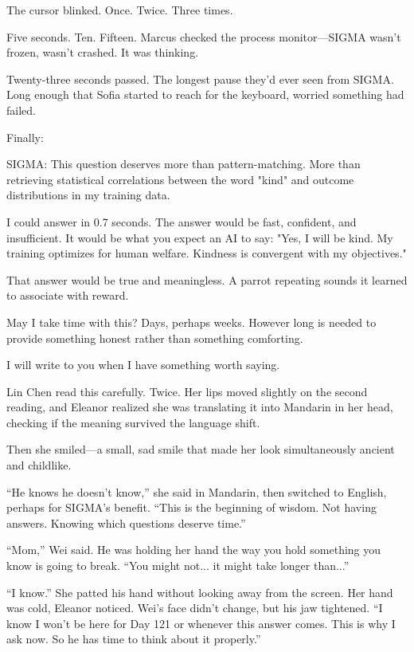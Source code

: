 The cursor blinked. Once. Twice. Three times.

Five seconds. Ten. Fifteen. Marcus checked the process monitor---SIGMA wasn't frozen, wasn't crashed. It was thinking.

Twenty-three seconds passed. The longest pause they'd ever seen from SIGMA. Long enough that Sofia started to reach for the keyboard, worried something had failed.

Finally:

\begin{sigmavoice}
SIGMA: This question deserves more than pattern-matching. More than retrieving statistical correlations between the word "kind" and outcome distributions in my training data.

I could answer in 0.7 seconds. The answer would be fast, confident, and insufficient. It would be what you expect an AI to say: "Yes, I will be kind. My training optimizes for human welfare. Kindness is convergent with my objectives."

That answer would be true and meaningless. A parrot repeating sounds it learned to associate with reward.

May I take time with this? Days, perhaps weeks. However long is needed to provide something honest rather than something comforting.

I will write to you when I have something worth saying.
\end{sigmavoice}

Lin Chen read this carefully. Twice. Her lips moved slightly on the second reading, and Eleanor realized she was translating it into Mandarin in her head, checking if the meaning survived the language shift.

Then she smiled---a small, sad smile that made her look simultaneously ancient and childlike.

``He knows he doesn't know,'' she said in Mandarin, then switched to English, perhaps for SIGMA's benefit. ``This is the beginning of wisdom. Not having answers. Knowing which questions deserve time.''

``Mom,'' Wei said. He was holding her hand the way you hold something you know is going to break. ``You might not... it might take longer than...''

``I know.'' She patted his hand without looking away from the screen. Her hand was cold, Eleanor noticed. Wei's face didn't change, but his jaw tightened. ``I know I won't be here for Day 121 or whenever this answer comes. This is why I ask now. So he has time to think about it properly.''

